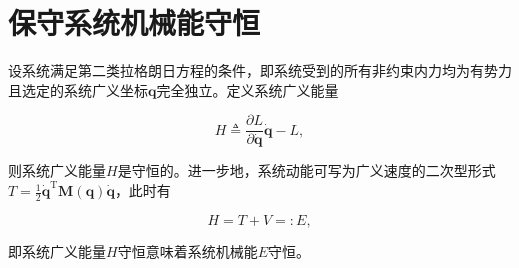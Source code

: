 \section{保守系统机械能守恒}
\begin{theorem}[保守系统机械能守恒]
设系统满足第二类拉格朗日方程的条件，即系统受到的所有非约束内力均为有势力且选定的系统广义坐标$\boldsymbol{q}$完全独立。定义系统广义能量

\[
H \triangleq \frac{\partial L}{\partial \dot{\boldsymbol{q}}}\dot{\boldsymbol{q}} - L,
\]

则系统广义能量$H$是守恒的。进一步地，系统动能可写为广义速度的二次型形式$T = \frac{1}{2}\dot{\boldsymbol{q}}^{\mathrm{T}}\boldsymbol{M}(\boldsymbol{q})\dot{\boldsymbol{q}}$，此时有

\[
H = T + V =: E,
\]

即系统广义能量$H$守恒意味着系统机械能$E$守恒。
\end{theorem}
